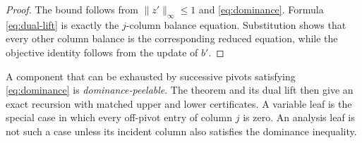 \begin{proof}
The bound follows from \(\|z'\|_\infty\le1\) and
\eqref{eq:dominance}.  Formula \eqref{eq:dual-lift} is exactly the
\(j\)-column balance equation.  Substitution shows that every other
column balance is the corresponding reduced equation, while the
objective identity follows from the update of \(b'\).
\end{proof}

A component that can be exhausted by successive pivots satisfying
\eqref{eq:dominance} is \emph{dominance-peelable}.  The theorem and its
dual lift then give an exact recursion with matched upper and lower
certificates.  A variable leaf is the special case in which every
off-pivot entry of column \(j\) is zero.  An analysis leaf is not such a
case unless its incident column also satisfies the dominance inequality.

